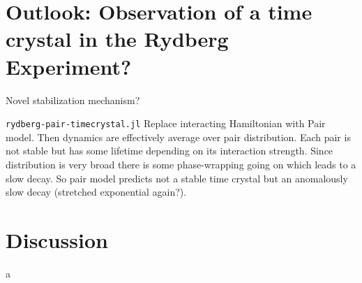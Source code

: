 \chapter{Outlook: Observation of a time crystal in the Rydberg Experiment?}
Novel stabilization mechanism?

\texttt{rydberg-pair-timecrystal.jl}
Replace interacting Hamiltonian with Pair model. Then dynamics are effectively average over pair  distribution. Each pair is not stable but has some lifetime depending on its interaction strength. Since distribution is very broad there is some phase-wrapping going on which leads to a slow decay. So pair model predicts not a stable time crystal but an anomalously slow decay (stretched exponential again?).

\chapter{Discussion}\label{ch:floquet-discussion}

a